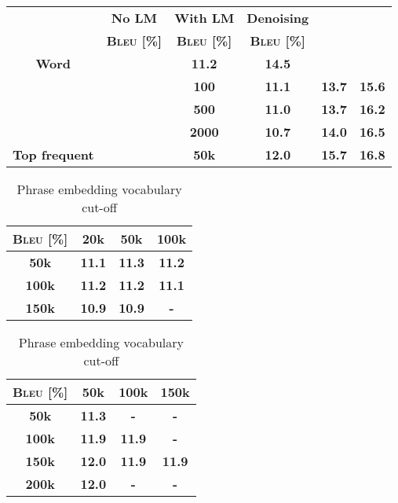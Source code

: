 \begin{table}[]
	\centering
	\begin{tabular}{>{\bfseries}c>{\bfseries}c>{\bfseries}c>{\bfseries}c>{\bfseries}c  >{\bfseries}c}
		\hline
		\multicolumn{3}{c}{\multirow{2}{*}{\textbf{Vocabulary}}}                  & No LM & With LM & Denoising \\
		\multicolumn{3}{c}{}                                         &  \textsc{Bleu} [\%]  &  \textsc{Bleu} [\%] & \textsc{Bleu} [\%]   \\ \hline
		Word            & \multicolumn{2}{l}{}              & 11.2 & 14.5  &\leavevmode\color{blue}{ 17.2} \\
		\hline
		\multirow{3}{*}{\cite{mikolov2013distributed} } & \multirow{3}{*}{threshold} & 100  & 11.1 & 13.7  & 15.6 \\ \cline{3-6} 
		&                            & 500  & 11.0 & 13.7  & 16.2 \\ \cline{3-6} 
		&                            & 2000 & 10.7 & 14.0  &16.5 \\ \hline
		Top frequent              & \multicolumn{1}{l}{\textbf{count}}  & 50k  & \leavevmode\color{blue}12.0 & \leavevmode\color{blue}15.7  & 16.8 \\ \hline
	\end{tabular}
\end{table}


\begin{table}
	\parbox{.5\linewidth}{
		\centering
		\caption{Word embedding vocabulary cut-off}
		\begin{tabular}{>{\bfseries}c >{\bfseries}c >{\bfseries}c >{\bfseries}c } 
			\hline
			\textsc{Bleu} [\%]	& 20k & 50k & 100k \\
			\hline
			50k &	11.1  & \leavevmode\color{blue}11.3 & 11.2  \\ 
			\hline
			100k&	11.2  & 11.2 & 11.1 \\ 			
			\hline
			150k&	10.9 & 10.9 & - \\
			\hline
		\end{tabular}
		
	}
	\hfill
	\parbox{.5\linewidth}{
		\centering
		\caption{Phrase embedding vocabulary cut-off}
		\begin{tabular}{>{\bfseries}c >{\bfseries}c >{\bfseries}c >{\bfseries}c } 
			\hline
			\textsc{Bleu} [\%]	& 50k & 100k & 150k \\
			\hline
			50k &	11.3  & - & -  \\ 
			\hline
			100k&	11.9  & 11.9 & - \\ 			
			\hline
			150k&	\leavevmode\color{blue}12.0 & 11.9 & 11.9 \\
			\hline
			200k & 12.0 & - & - \\
			\hline
		\end{tabular}
		
	}
\end{table}